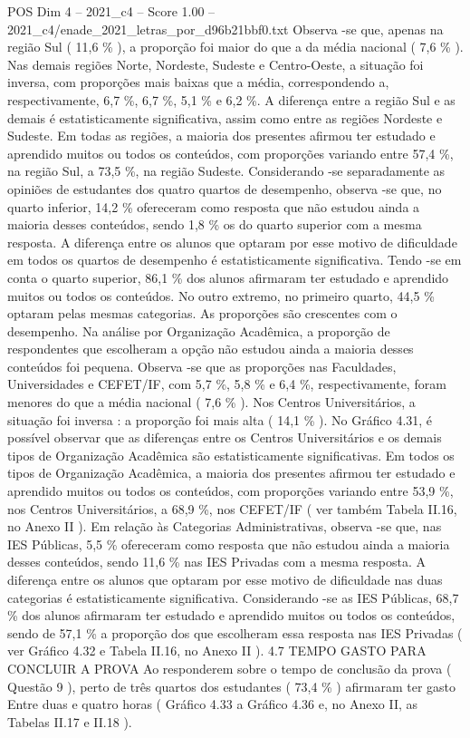 \begin{textsample}{POS Dim 4 – 2021\_c4 – Score 1.00 – 2021\_c4/enade\_2021\_letras\_por\_d96b21bbf0.txt}
Observa -se que, apenas na região Sul ( 11,6 \% ), a proporção foi maior do que a da média nacional ( 7,6 \% ).
Nas demais regiões Norte, Nordeste, Sudeste e Centro-Oeste, a situação foi inversa, com proporções mais baixas que a média, correspondendo a, respectivamente, 6,7 \%, 6,7 \%, 5,1 \% e 6,2 \%.
A diferença entre a região Sul e as demais é estatisticamente significativa, assim como entre as regiões Nordeste e Sudeste.
Em todas as regiões, a maioria dos presentes afirmou ter estudado e aprendido muitos ou todos os conteúdos, com proporções variando entre 57,4 \%, na região Sul, a 73,5 \%, na região Sudeste.
Considerando -se separadamente as opiniões de estudantes dos quatro quartos de desempenho, observa -se que, no quarto inferior, 14,2 \% ofereceram como resposta que não estudou ainda a maioria desses conteúdos, sendo 1,8 \% os do quarto superior com a mesma resposta.
A diferença entre os alunos que optaram por esse motivo de dificuldade em todos os quartos de desempenho é estatisticamente significativa.
Tendo -se em conta o quarto superior, 86,1 \% dos alunos afirmaram ter estudado e aprendido muitos ou todos os conteúdos.
No outro extremo, no primeiro quarto, 44,5 \% optaram pelas mesmas categorias.
As proporções são crescentes com o desempenho.
Na análise por Organização Acadêmica, a proporção de respondentes que escolheram a opção não estudou ainda a maioria desses conteúdos foi pequena.
Observa -se que as proporções nas Faculdades, Universidades e CEFET/IF, com 5,7 \%, 5,8 \% e 6,4 \%, respectivamente, foram menores do que a média nacional ( 7,6 \% ).
Nos Centros Universitários, a situação foi inversa : a proporção foi mais alta ( 14,1 \% ).
No Gráfico 4.31, é possível observar que as diferenças entre os Centros Universitários e os demais tipos de Organização Acadêmica são estatisticamente significativas.
Em todos os tipos de Organização Acadêmica, a maioria dos presentes afirmou ter estudado e aprendido muitos ou todos os conteúdos, com proporções variando entre 53,9 \%, nos Centros Universitários, a 68,9 \%, nos CEFET/IF ( ver também Tabela II.16, no Anexo II ).
Em relação às Categorias Administrativas, observa -se que, nas IES Públicas, 5,5 \% ofereceram como resposta que não estudou ainda a maioria desses conteúdos, sendo 11,6 \% nas IES Privadas com a mesma resposta.
A diferença entre os alunos que optaram por esse motivo de dificuldade nas duas categorias é estatisticamente significativa.
Considerando -se as IES Públicas, 68,7 \% dos alunos afirmaram ter estudado e aprendido muitos ou todos os conteúdos, sendo de 57,1 \% a proporção dos que escolheram essa resposta nas IES Privadas ( ver Gráfico 4.32 e Tabela II.16, no Anexo II ). 4.7 TEMPO GASTO PARA CONCLUIR A PROVA Ao responderem sobre o tempo de conclusão da prova ( Questão 9 ), perto de três quartos dos estudantes ( 73,4 \% ) afirmaram ter gasto Entre duas e quatro horas ( Gráfico 4.33 a Gráfico 4.36 e, no Anexo II, as Tabelas II.17 e II.18 ).

\end{textsample}
